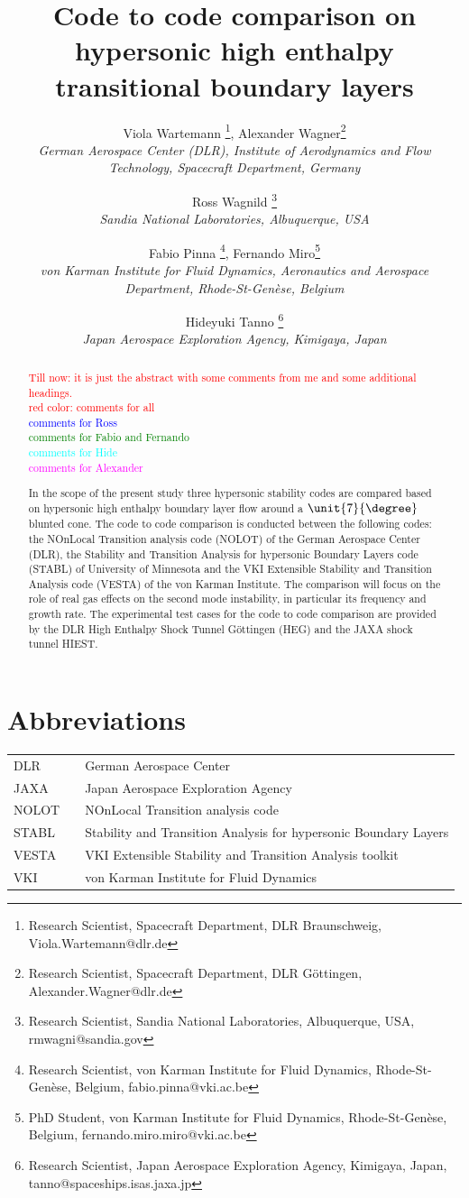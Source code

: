 \documentclass[]{aiaa-tc}%
\title{Code to code comparison on hypersonic high enthalpy transitional boundary layers}
\author{
  Viola Wartemann%
  \thanks{Research Scientist, Spacecraft Department, DLR Braunschweig, Viola.Wartemann@dlr.de}, Alexander Wagner\thanks{Research Scientist, Spacecraft Department, DLR G\"ottingen, Alexander.Wagner@dlr.de}\\
  {\normalsize\itshape
  German Aerospace Center (DLR), Institute of Aerodynamics and Flow Technology, Spacecraft Department, Germany} \\
  \and
  Ross Wagnild%
    \thanks{Research Scientist, Sandia National Laboratories, Albuquerque, USA, rmwagni@sandia.gov} \\
{\normalsize\itshape
  Sandia National Laboratories, Albuquerque, USA} \\
  \and
  Fabio Pinna%
    \thanks{Research Scientist, von Karman Institute for Fluid Dynamics, Rhode-St-Genèse, Belgium, fabio.pinna@vki.ac.be}, Fernando Miro\thanks{PhD Student, von Karman Institute for Fluid Dynamics, Rhode-St-Genèse, Belgium, fernando.miro.miro@vki.ac.be} \\   
{\normalsize\itshape
  von Karman Institute for Fluid Dynamics, Aeronautics and Aerospace Department, Rhode-St-Genèse, Belgium} \\
  \and
  Hideyuki Tanno%
    \thanks{Research Scientist, Japan Aerospace Exploration Agency, Kimigaya, Japan, tanno@spaceships.isas.jaxa.jp} \\
{\normalsize\itshape
 Japan Aerospace Exploration Agency, Kimigaya, Japan} \\
}
\begin{document}
\maketitle


\begin{abstract}

\textcolor{red}{Till now: it is just the abstract with some comments from me and some additional headings. \\ red color: comments for all}\\
\textcolor{blue}{comments for Ross}\\
\textcolor{green}{comments for Fabio and Fernando}\\
\textcolor{cyan}{comments for Hide}\\
\textcolor{magenta}{comments for Alexander}

In the scope of the present study three hypersonic stability codes are compared based on hypersonic high enthalpy boundary layer flow around a $\unit{7}{\degree}$ blunted cone. The code to code comparison is conducted between the following codes: the  NOnLocal Transition analysis code (NOLOT) of the German Aerospace Center (DLR), the Stability and Transition Analysis for hypersonic Boundary Layers code (STABL) of University of Minnesota and the VKI Extensible Stability and Transition Analysis code (VESTA) of the von Karman Institute. The comparison will focus on the role of real gas effects on the second mode instability, in particular its frequency and growth rate. The experimental test cases for the code to code comparison are provided by the DLR High Enthalpy Shock Tunnel G\"ottingen (HEG) and the JAXA shock tunnel HIEST.  

\end{abstract}


\section*{Abbreviations}
\begin{tabular}{lll}
DLR   &    &  German Aerospace Center \\
JAXA & &  Japan Aerospace Exploration Agency\\
NOLOT & & NOnLocal Transition analysis code\\
STABL & & Stability and Transition Analysis for hypersonic Boundary Layers\\
VESTA & & VKI Extensible Stability and Transition Analysis toolkit \\
VKI & &  von Karman Institute for Fluid Dynamics\\

\end{tabular}
\end{document}
